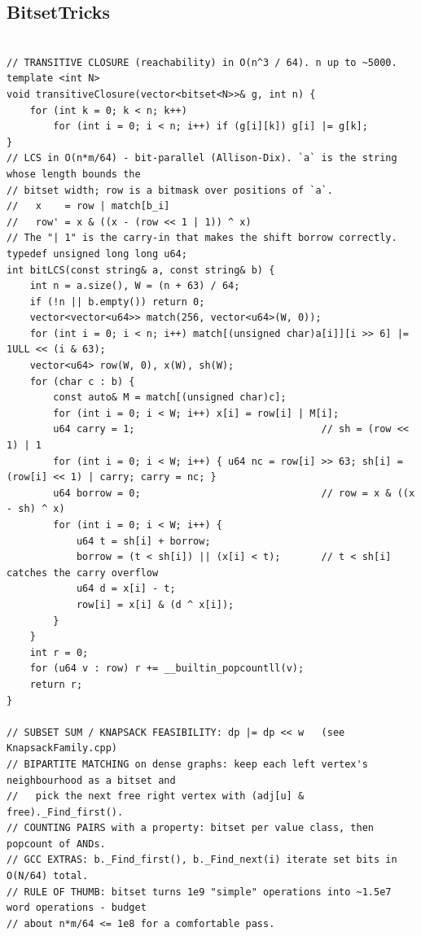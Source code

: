 \documentclass[9pt,a4paper,twocolumn]{extarticle}
\begin{document}
\subsection{BitsetTricks}
\nopagebreak
\begin{lstlisting}

// TRANSITIVE CLOSURE (reachability) in O(n^3 / 64). n up to ~5000.
template <int N>
void transitiveClosure(vector<bitset<N>>& g, int n) {
    for (int k = 0; k < n; k++)
        for (int i = 0; i < n; i++) if (g[i][k]) g[i] |= g[k];
}
// LCS in O(n*m/64) - bit-parallel (Allison-Dix). `a` is the string whose length bounds the
// bitset width; row is a bitmask over positions of `a`.
//   x    = row | match[b_i]
//   row' = x & ((x - (row << 1 | 1)) ^ x)
// The "| 1" is the carry-in that makes the shift borrow correctly.
typedef unsigned long long u64;
int bitLCS(const string& a, const string& b) {
    int n = a.size(), W = (n + 63) / 64;
    if (!n || b.empty()) return 0;
    vector<vector<u64>> match(256, vector<u64>(W, 0));
    for (int i = 0; i < n; i++) match[(unsigned char)a[i]][i >> 6] |= 1ULL << (i & 63);
    vector<u64> row(W, 0), x(W), sh(W);
    for (char c : b) {
        const auto& M = match[(unsigned char)c];
        for (int i = 0; i < W; i++) x[i] = row[i] | M[i];
        u64 carry = 1;                                // sh = (row << 1) | 1
        for (int i = 0; i < W; i++) { u64 nc = row[i] >> 63; sh[i] = (row[i] << 1) | carry; carry = nc; }
        u64 borrow = 0;                               // row = x & ((x - sh) ^ x)
        for (int i = 0; i < W; i++) {
            u64 t = sh[i] + borrow;
            borrow = (t < sh[i]) || (x[i] < t);       // t < sh[i] catches the carry overflow
            u64 d = x[i] - t;
            row[i] = x[i] & (d ^ x[i]);
        }
    }
    int r = 0;
    for (u64 v : row) r += __builtin_popcountll(v);
    return r;
}

// SUBSET SUM / KNAPSACK FEASIBILITY: dp |= dp << w   (see KnapsackFamily.cpp)
// BIPARTITE MATCHING on dense graphs: keep each left vertex's neighbourhood as a bitset and
//   pick the next free right vertex with (adj[u] & free)._Find_first().
// COUNTING PAIRS with a property: bitset per value class, then popcount of ANDs.
// GCC EXTRAS: b._Find_first(), b._Find_next(i) iterate set bits in O(N/64) total.
// RULE OF THUMB: bitset turns 1e9 "simple" operations into ~1.5e7 word operations - budget
// about n*m/64 <= 1e8 for a comfortable pass.
\end{lstlisting}
\end{document}
